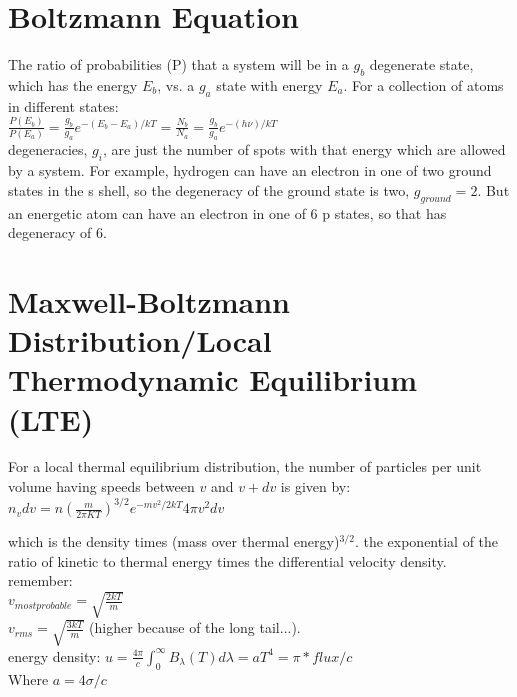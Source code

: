 \documentclass[12pt]{report}
\begin{document}
\section{Boltzmann Equation}
 The ratio of probabilities (P) that a system will be in a $g_b$ degenerate state, which has the energy  $E_b$, vs. a $g_a$ state with energy $E_a$. For a collection of atoms in different states:\\
 $\frac{P(E_b)}{P(E_a)} =\frac{g_b}{g_a}e^{-(E_b-E_a)/kT}=\frac{N_b}{N_a}=\frac{g_b}{g_a}e^{-(h\nu)/kT}$\\
degeneracies, $g_i$, are just the number of spots with that energy which are allowed by a system. For example, hydrogen can have an electron in one of two ground states in the s shell, so the degeneracy of the ground state is two, $g_{ground}=2$. But an energetic atom can have an electron in one of 6 p states, so that has degeneracy of 6.
 
 \section{Maxwell-Boltzmann Distribution/Local Thermodynamic Equilibrium (LTE)}
 For a local thermal equilibrium distribution, the number of particles per unit volume having speeds between $v$ and $v+dv$ is given by:\\
 
 $n_vdv=n(\frac{m}{2\pi KT})^{3/2} e^{-mv^2/2kT}4\pi v^2 dv$ 
 
 which is the density times   (mass over thermal energy)$^{3/2}$.
   the exponential of the ratio of kinetic to thermal energy times the differential velocity density.
 remember: \\
$ v_{most probable}=\sqrt{\frac{2kT}{m}}$ \\
$v_{rms}=\sqrt{\frac{3kT}{m}}$ (higher because of the long tail...).\\

 energy density: $u=\frac{4\pi}{c}\int_0^\infty B_\lambda(T)d\lambda=aT^4=\pi*flux/c$\\
 Where  $a=4\sigma/c$\\


\end{document}
